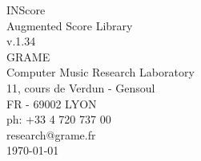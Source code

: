 \documentclass[a4paper]{book}
\begin{document}
\begin{titlepage}
\vspace*{7cm}
\begin{center}
{\huge INScore\\ Augmented Score Library \\[1ex]\large v.1.34}\\
\vspace*{2cm}
{\large GRAME \\ Computer Music Research Laboratory}\\
\vspace*{0.5cm}
{\small 11, cours de Verdun - Gensoul}\\
{\small FR - 69002 LYON}\\
\vspace*{0.5cm}
{\small ph:  +33 4 720 737 00}\\
\vspace*{0.5cm}
{\small research@grame.fr}\\
\vspace*{0.5cm}
\today 
\end{center}
\end{titlepage}
\clearemptydoublepage
{}
\tableofcontents
\clearemptydoublepage
{}
\end{document}
